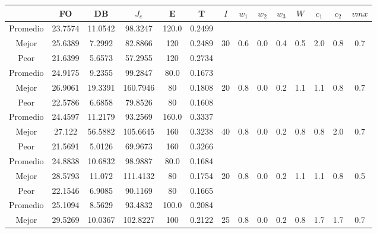 \begin{table}[h!]
    \footnotesize
    \begin{center}
        \begin{tabular}{|c|c|c|c|c|c|c|c|c|c|c|c|c|c|}
        \hline
            & {\bf FO} & {\bf DB} & $J_e$ & {\bf E} & {\bf T} & $I$ & $w_1$ & $w_2$ & $w_3$ & $W$ & $c_1$ & $c_2$ & $vmx$ \\
        \hline
        \hline
            Promedio  & 23.7574 & 11.0542 & 98.3247 & 120.0 & 0.2499 &  &  &  &  &  &  &  & \\
            \cline{1-6}
            Mejor & 25.6389 & 7.2992  & 82.8866 & 120 & 0.2489 & 30 & 0.6 & 0.0 & 0.4 & 0.5 & 2.0 & 0.8 & 0.7\\
            \cline{1-6}
            Peor & 21.6399 & 5.6573  & 57.2955 & 120 & 0.2734 &  &  &  &  &  &  &  & \\
        \hline
        \hline
            Promedio  & 24.9175 & 9.2355 & 99.2847 & 80.0 & 0.1673 &  &  &  &  &  &  &  & \\
            \cline{1-6}
            Mejor & 26.9061 & 19.3391  & 160.7946 & 80 & 0.1808 & 20 & 0.8 & 0.0 & 0.2 & 1.1 & 1.1 & 0.8 & 0.7\\
            \cline{1-6}
            Peor & 22.5786 & 6.6858  & 79.8526 & 80 & 0.1608 &  &  &  &  &  &  &  & \\
        \hline
        \hline
            Promedio  & 24.4597 & 11.2179 & 93.2569 & 160.0 & 0.3337 &  &  &  &  &  &  &  & \\
            \cline{1-6}
            Mejor & 27.122 & 56.5882  & 105.6645 & 160 & 0.3238 & 40 & 0.8 & 0.0 & 0.2 & 0.8 & 0.8 & 2.0 & 0.7\\
            \cline{1-6}
            Peor & 21.5691 & 5.0126  & 69.9673 & 160 & 0.3266 &  &  &  &  &  &  &  & \\
        \hline
        \hline
            Promedio  & 24.8838 & 10.6832 & 98.9887 & 80.0 & 0.1684 &  &  &  &  &  &  &  & \\
            \cline{1-6}
            Mejor & 28.5793 & 11.072  & 111.4132 & 80 & 0.1754 & 20 & 0.8 & 0.0 & 0.2 & 1.1 & 1.1 & 0.8 & 0.5\\
            \cline{1-6}
            Peor & 22.1546 & 6.9085  & 90.1169 & 80 & 0.1665 &  &  &  &  &  &  &  & \\
        \hline
        \hline
            Promedio  & 25.1094 & 8.5629 & 93.4832 & 100.0 & 0.2084 &  &  &  &  &  &  &  & \\
            \cline{1-6}
            Mejor & 29.5269 & 10.0367  & 102.8227 & 100 & 0.2122 & 25 & 0.8 & 0.0 & 0.2 & 0.8 & 1.7 & 1.7 & 0.7\\

\end{tabular}
\end{center}
\end{table}
